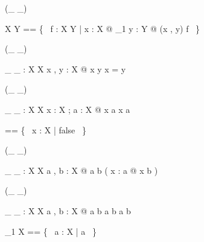 \begin{zed}
 \rightassoc (\_ \fun \_)
\end{zed}

\begin{zed}
X \fun Y == \{~ f : X \rel Y | \forall x : X @ \exists_1 y : Y @ (x , y) \in f ~\}
\end{zed}

\begin{zed}
\relation (\_ \neq \_)
\end{zed}

\begin{gendef}[X]
\_ \neq \_ : X \rel X
\where
\forall x , y : X @ x \neq y \iff \lnot x = y
\end{gendef}

\begin{zed}
\relation (\_ \notin \_)
\end{zed}

\begin{gendef}[X]
\_ \notin \_ : X \rel \power X
\where
\forall x : X ; a : \power X @ x \notin a \iff \lnot x \in a
\end{gendef}

\begin{zed}
\emptyset [ X ] == \{~ x : X | false ~\}
\end{zed}

\begin{zed}
\relation (\_ \subseteq \_)
\end{zed}

\begin{gendef}[X]
\_ \subseteq \_ : \power X \rel \power X
\where
\forall a , b : \power X @ a \subseteq b \iff
( \forall x : a @ x \in b )
\end{gendef}

\begin{zed}
\relation (\_ \subset \_)
\end{zed}

\begin{gendef}[X]
\_ \subset \_ : \power X \rel \power X
\where
\forall a , b : \power X @ a \subset b \iff
a \subseteq b \land a \neq b
\end{gendef}

\begin{zed}
\power_1 X == \{~ a : \power X | a \neq \emptyset ~\}
\end{zed}

